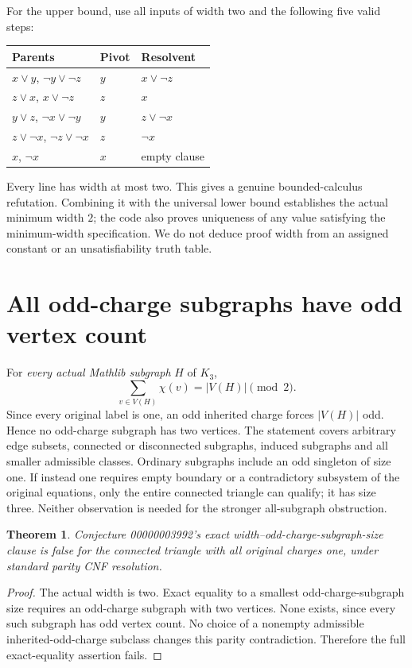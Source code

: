 \documentclass[10pt,a4paper]{article}
\newtheorem{theorem}{Theorem}
\begin{document}
For the upper bound, use all inputs of width two and the following five valid steps:
\begin{center}
\begin{tabular}{lll}
\toprule
Parents & Pivot & Resolvent\\
\midrule
$x\vee y$, $\neg y\vee\neg z$ & $y$ & $x\vee\neg z$\\
$z\vee x$, $x\vee\neg z$ & $z$ & $x$\\
$y\vee z$, $\neg x\vee\neg y$ & $y$ & $z\vee\neg x$\\
$z\vee\neg x$, $\neg z\vee\neg x$ & $z$ & $\neg x$\\
$x$, $\neg x$ & $x$ & empty clause\\
\bottomrule
\end{tabular}
\end{center}
Every line has width at most two. This gives a genuine bounded-calculus refutation.
Combining it with the universal lower bound establishes the actual minimum width $2$;
the code also proves uniqueness of any value satisfying the minimum-width specification.
We do not deduce proof width from an assigned constant or an unsatisfiability truth table.

\section{All odd-charge subgraphs have odd vertex count}
For \emph{every actual Mathlib subgraph} $H$ of $K_3$,
\[
 \sum_{v\in V(H)}\chi(v)=|V(H)|\pmod2.
\]
Since every original label is one, an odd inherited charge forces $|V(H)|$ odd.
Hence no odd-charge subgraph has two vertices. The statement covers arbitrary edge
subsets, connected or disconnected subgraphs, induced subgraphs and all smaller
admissible classes. Ordinary subgraphs include an odd singleton of size one.
If instead one requires empty boundary or a contradictory subsystem of the original
equations, only the entire connected triangle can qualify; it has size three.
Neither observation is needed for the stronger all-subgraph obstruction.

\begin{theorem}
Conjecture 00000003992's exact width--odd-charge-subgraph-size clause is false for the
connected triangle with all original charges one, under standard parity CNF resolution.
\end{theorem}
\begin{proof}
The actual width is two. Exact equality to a smallest odd-charge-subgraph size requires
an odd-charge subgraph with two vertices. None exists, since every such subgraph has odd
vertex count. No choice of a nonempty admissible inherited-odd-charge subclass changes this
parity contradiction. Therefore the full exact-equality assertion fails.
\end{proof}
\end{document}
